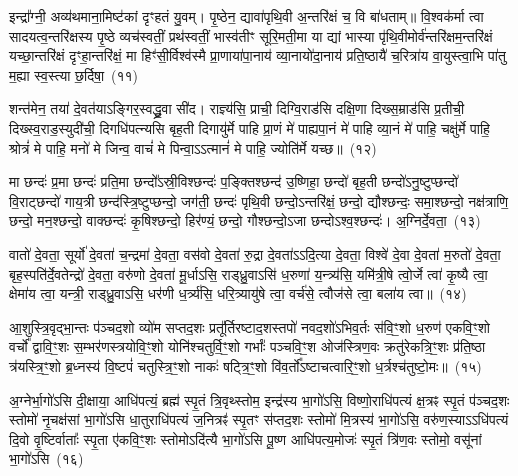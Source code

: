 {\anuvakamend[{पुरु॑षो॒ वयः॒ षड्विꣳ॑शतिश्च}]}

इन्द्रा᳚ग्नी॒ अव्य॑थमाना॒मिष्ट॑कां दृꣳहतं यु॒वम्। पृ॒ष्ठेन॒ द्यावा॑\-पृथि॒वी अ॒न्तरि॑क्षं च॒ वि बा॑धताम्॥ वि॒श्वक॑र्मा त्वा सादयत्व॒न्त\-रि॑क्षस्य पृ॒ष्ठे व्यच॑स्वतीं॒ प्रथ॑स्वतीं॒ भास्व॑तीꣳ सूरि॒मती॒मा या द्यां भास्या पृ॑थि॒वीमोर्व॑न्तरि॑क्षम॒न्तरि॑क्षं यच्छा॒न्तरि॑क्षं दृꣳहा॒न्तरि॑क्षं॒ मा हिꣳ॑सी॒र्विश्व॑स्मै प्रा॒णाया॑पा॒नाय॑ व्या॒नायो॑दा॒नाय॑ प्रति॒ष्ठायै॑ च॒रित्रा॑य वा॒युस्त्वा॒भि पा॑तु म॒ह्या स्व॒स्त्या छ॒र्दिषा॒~(११)\ip

शन्त॑मेन॒ तया॑ दे॒वत॑या\-ऽ\-ङ्गिर॒स्वद्ध्रु॒वा सी॑द। राज्ञ्य॑सि॒ प्राची॒ दिग्वि॒राड॑सि दक्षि॒णा दिख्स॒म्राड॑सि प्र॒तीची॒ दिख्स्व॒राड॒स्युदी॑ची॒ दिगधि॑पत्न्यसि बृह॒ती दिगायु॑र्मे पाहि प्रा॒णं मे॑ पाह्यपा॒नं मे॑ पाहि व्या॒नं मे॑ पाहि॒ चक्षु॑र्मे पाहि॒ श्रोत्रं॑ मे पाहि॒ मनो॑ मे जिन्व॒ वाचं॑ मे पिन्वा॒ऽऽत्मानं॑ मे पाहि॒ ज्योति॑र्मे यच्छ॥~(१२)\ip

{\anuvakamend[{छ॒र्दिषा॑ पिन्व॒ षट्च॑}]}

मा छन्दः॑ प्र॒मा छन्दः॑ प्रति॒मा छन्दो᳚\-ऽस्री॒विश्छन्दः॑ प॒ङ्क्तिश्छन्द॑ उ॒ष्णिहा॒ छन्दो॑ बृह॒ती छन्दो॑\-ऽनु॒ष्टुप्छन्दो॑ वि॒राट्छन्दो॑ गाय॒त्री छन्द॑स्\-त्रि॒ष्टुप्छन्दो॒ जग॑ती॒ छन्दः॑ पृथि॒वी छन्दो॒\-ऽन्तरि॑क्षं॒ छन्दो॒ द्यौश्छन्दः॒ समा॒श्छन्दो॒ नक्ष॑त्राणि॒ छन्दो॒ मन॒श्छन्दो॒ वाक्छन्दः॑ कृ॒षिश्छन्दो॒ हिर॑ण्यं॒ छन्दो॒ गौश्छन्दो॒\-ऽजा छन्दो\-ऽश्व॒श्छन्दः॑। अ॒ग्निर्दे॒वता॒~(१३)\ip

वातो॑ दे॒वता॒ सूर्यो॑ दे॒वता॑ च॒न्द्रमा॑ दे॒वता॒ वस॑वो दे॒वता॑ रु॒द्रा दे॒वता॑ऽऽदि॒त्या दे॒वता॒ विश्वे॑ दे॒वा दे॒वता॑ म॒रुतो॑ दे॒वता॒ बृह॒स्पति॑र्दे॒वतेन्द्रो॑ दे॒वता॒ वरु॑णो दे॒वता॑ मू॒र्धाऽसि॒ राड्ध्रु॒वाऽसि॑ ध॒रुणा॑ य॒न्त्र्य॑सि॒ यमि॑त्री॒षे त्वो॒र्जे त्वा॑ कृ॒ष्यै त्वा॒ क्षेमा॑य त्वा॒ यन्त्री॒ राड्ध्रु॒वाऽसि॒ धर॑णी ध॒र्त्र्य॑सि॒ धरि॒त्र्यायु॑षे त्वा॒ वर्च॑से॒ त्वौज॑से त्वा॒ बला॑य त्वा॥~(१४)\ip

{\anuvakamend[{दे॒वता\-ऽऽ\-यु॑षे त्वा॒ षट्च॑}]}

आ॒शुस्त्रि॒वृद्भा॒न्तः प॑ञ्चद॒शो व्यो॑म सप्तद॒शः प्रतू᳚र्तिरष्टाद॒शस्तपो॑ नवद॒शो॑\-ऽभिव॒र्तः स॑वि॒ꣳ॒शो ध॒रुण॑ एकवि॒ꣳ॒शो वर्चो᳚ द्वा\-वि॒ꣳ॒शः स॒म्भर॑णस्त्रयो\-वि॒ꣳ॒शो योनि॑श्चतुर्वि॒ꣳ॒शो गर्भाः᳚ पञ्च\-वि॒ꣳ॒श ओज॑स्\-त्रिण॒वः क्रतु॑रेकत्रि॒ꣳ॒शः प्र॑ति॒ष्ठा त्र॑यस्त्रि॒ꣳ॒शो ब्र॒ध्नस्य॑ वि॒ष्टपं॑ चतुस्\-त्रि॒ꣳ॒शो नाकः॑ षट्त्रि॒ꣳ॒शो वि॑व॒र्तो᳚\-ऽष्टाचत्वारि॒ꣳ॒शो ध॒र्त्रश्च॑तुष्टो॒मः॥~(१५)\ip

{\anuvakamend[{आ॒शुः स॒प्तत्रिꣳ॑शत्}]}

अ॒ग्नेर्भा॒गो॑\-ऽसि दी॒क्षाया॒ आधि॑पत्यं॒ ब्रह्म॑ स्पृ॒तं त्रि॒वृथ्स्तोम॒ इन्द्र॑स्य भा॒गो॑\-ऽसि॒ विष्णो॒राधि॑पत्यं क्ष॒त्रꣴ स्पृ॒तं प॑ञ्चद॒शः स्तोमो॑ नृ॒चक्ष॑सां भा॒गो॑\-ऽसि धा॒तुराधि॑पत्यं ज॒नित्रꣴ॑ स्पृ॒तꣳ स॑प्तद॒शः स्तोमो॑ मि॒त्रस्य॑ भा॒गो॑\-ऽसि॒ वरु॑ण॒स्या\-ऽऽधि॑पत्यं दि॒वो वृ॒ष्टिर्वाताः᳚ स्पृ॒ता ए॑क\-वि॒ꣳ॒शः स्तोमो\-ऽदि॑त्यै भा॒गो॑\-ऽसि पू॒ष्ण आधि॑पत्य॒मोजः॑ स्पृ॒तं त्रि॑ण॒वः स्तोमो॒ वसू॑नां भा॒गो॑\-ऽसि~(१६)\ip

